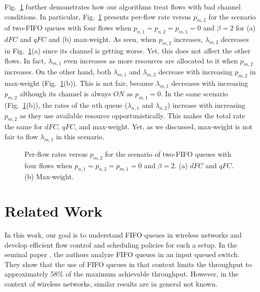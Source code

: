 \documentclass[conference]{IEEEtran}
\begin{document}
Fig.~\ref{fig:sim_4} further demonstrates how our algorithms treat flows with bad channel conditions. In particular, Fig.~\ref{fig:sim_4} presents per-flow rate versus $p_{m,2}$ for the scenario of two-FIFO queues with four flows when $p_{n,1}=p_{n,2}=p_{m,1}=0$ and $\beta=2$ for (a) $dFC$ and $qFC$ and (b) max-weight. As seen, when $p_{m,2}$ increases, $\lambda_{m,2}$ decreases in Fig.~\ref{fig:sim_4}(a) since its channel is getting worse. Yet, this does not affect the other flows. In fact, $\lambda_{m,1}$ even increases as more resources are allocated to it when $p_{m,2}$ increases. On the other hand, both $\lambda_{m,1}$ and $\lambda_{m,2}$ decrease with increasing $p_{m,2}$ in max-weight (Fig.~\ref{fig:sim_4}(b)). This is not fair, because $\lambda_{m,1}$ decreases with increasing $p_{m,2}$ although its channel is always $ON$ as $p_{m,1}=0$. In the same scenario (Fig.~\ref{fig:sim_4}(b)), the rates of the $n$th queue ($\lambda_{n,1}$ and $\lambda_{n,2}$) increase with increasing $p_{m,2}$ as they use available resource opportunistically. This makes the total rate the same for $dFC$, $qFC$, and max-weight. Yet, as we discussed, max-weight is not fair to flow $\lambda_{m,1}$ in this scenario. 



\begin{figure}
\centering
{} \hspace{-20pt}
\vspace{-10pt}
\caption{Per-flow rates versus $p_{m,2}$ for the scenario of two-FIFO queues with four flows when $p_{n,1}=p_{n,2}=p_{m,1}=0$ and $\beta=2$. (a) $dFC$ and $qFC$. (b) Max-weight.}
\label{fig:sim_4}
\vspace{-5pt}
\end{figure}


\section{Related Work}\label{sec:related}
In this work, our goal is to understand FIFO queues in wireless networks and develop efficient flow control and scheduling policies for such a setup. In the seminal paper \cite{Karol87}, the authors analyze FIFO queues in an input queued switch. They show that the use of FIFO queues in that context limits the throughput to approximately 58\% of the maximum achievable throughput. However, in the context of wireless networks, similar results are in general not known.
\end{document}
